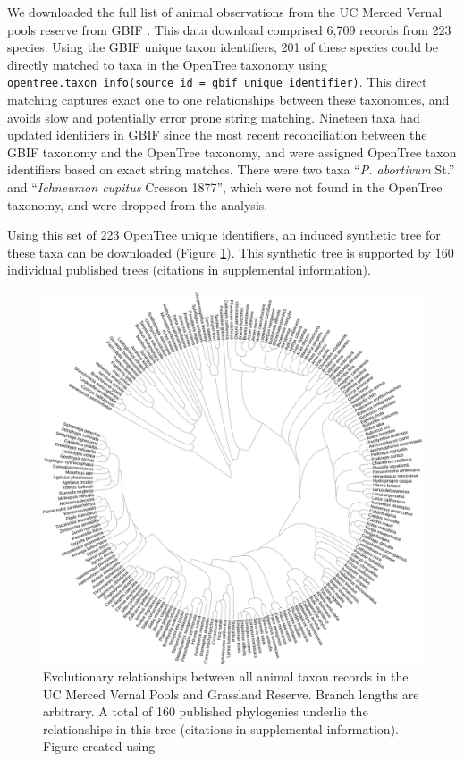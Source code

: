 \documentclass[oupdraft]{sysbio_sse}
\begin{document}
We downloaded the full list of animal observations from the UC Merced Vernal pools reserve from GBIF \citep{gbif_secretariat_gbif_2019}. This data download comprised 6,709 records from 223 species. Using the GBIF unique taxon identifiers, 201 of these species could be directly matched to taxa in the OpenTree taxonomy using \texttt{opentree.taxon\_info(source\_id = {gbif unique identifier})}. This direct matching captures exact one to one relationships between these taxonomies, and avoids slow and potentially error prone string matching. Nineteen taxa had updated identifiers in GBIF since the most recent reconciliation between the GBIF taxonomy and the OpenTree taxonomy, and were assigned OpenTree taxon identifiers based on exact string matches. There were two taxa ``\textit{P. abortivum} St.'' and ``\textit{Ichneumon cupitus} Cresson 1877'', which were not found in the OpenTree taxonomy, and were dropped from the analysis.


Using this set of 223 OpenTree unique identifiers, an induced synthetic tree for these taxa can be downloaded (Figure \ref{vernalanimals}). This synthetic tree is supported by 160 individual published trees (citations in supplemental information).

\begin{figure}[!h]
\centering\includegraphics[width=\textwidth]{vernal_animals}
\caption{Evolutionary relationships between all animal taxon records in the UC Merced Vernal Pools and Grassland Reserve. Branch lengths are arbitrary. A total of 160 published phylogenies underlie the relationships in this tree (citations in supplemental information). Figure created using \citep{letunic_interactive_2019}}
\label{vernalanimals}
\end{figure}
\end{document}
